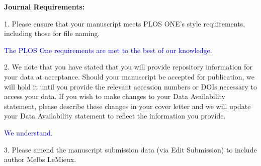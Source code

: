 \documentclass[12pt]{letter}
\newcommand{\blue}[1]{\textcolor{blue}{#1}} %
\begin{document}












\newpage
\textbf{Journal Requirements:}

1. Please ensure that your manuscript meets PLOS ONE's style requirements, including those for file naming.

\blue{The PLOS One requirements are met to the best of our knowledge. }

2. We note that you have stated that you will provide repository information for your data at acceptance. 
Should your manuscript be accepted for publication, we will hold it until you provide the relevant accession numbers or DOIs necessary to access your data. 
If you wish to make changes to your Data Availability statement, please describe these changes in your cover letter and we will update your Data Availability statement to reflect the information you provide.

\blue{We understand.}

3. Please amend the manuscript submission data (via Edit Submission) to include author Melbs LeMieux.
\end{document}
